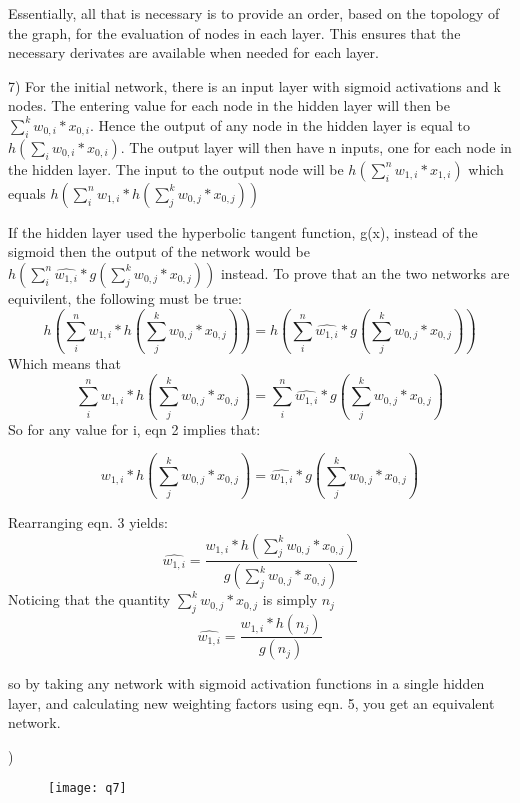 \documentclass[12pt]{article}
\begin{document}
Essentially, all that is necessary is to provide an order, based on the topology of the graph, for the evaluation of nodes in each layer. 
This ensures that the necessary derivates are available when needed for each layer. 

\pagebreak
\setcounter{equation}{0}
7) For the initial network, there is an input layer with sigmoid activations and k nodes. The entering value for each node in the 
hidden layer will then be $\sum_i^k w_{0,i}*x_{0,i}$. Hence the output of any node in the hidden layer is equal to 
$h(\sum_i w_{0,i}*x_{0,i})$. The output layer will then have n inputs, one for each node in the hidden layer. 
The input to the output node will be $h(\sum_i^n w_{1,i}*x_{1,i})$ which equals $h(\sum_i^n w_{1,i}*h(\sum_j^k w_{0,j}*x_{0,j}))$

If the hidden layer used the hyperbolic tangent function, g(x), instead of the sigmoid then the output of the network would be 
$h(\sum_i^n \hat{w_{1,i}}*g(\sum_j^k w_{0,j}*x_{0,j}))$ instead. To prove that an the two networks are equivilent, the following must be 
true: 
\begin{equation}
    h(\sum_i^n w_{1,i}*h(\sum_j^k w_{0,j}*x_{0,j})) = h(\sum_i^n \hat{w_{1,i}}*g(\sum_j^k w_{0,j}*x_{0,j}))
\end{equation}
Which means that 
\begin{equation}
    \sum_i^n w_{1,i}*h(\sum_j^k w_{0,j}*x_{0,j}) = \sum_i^n \hat{w_{1,i}}*g(\sum_j^k w_{0,j}*x_{0,j})
\end{equation}
So for any value for i, eqn 2 implies that: 

\begin{equation}
    w_{1,i}*h(\sum_j^k w_{0,j}*x_{0,j}) = \hat{w_{1,i}}*g(\sum_j^k w_{0,j}*x_{0,j})
\end{equation}

Rearranging eqn. 3 yields: 
\begin{equation}
     \hat{w_{1,i}} = \frac{w_{1,i}*h(\sum_j^k w_{0,j}*x_{0,j})}{g(\sum_j^k w_{0,j}*x_{0,j})}
\end{equation}
Noticing that the quantity $\sum_j^k w_{0,j}*x_{0,j}$ is simply $n_j$
\begin{equation}
     \hat{w_{1,i}} = \frac{w_{1,i}*h(n_j)}{g(n_j)}
\end{equation}

so by taking any network with sigmoid activation functions in a single hidden layer, and calculating new 
weighting factors using eqn. 5, you get an equivalent network. 

) 
    \begin{figure}[htb!]
        \texttt{[image: q7]}
    \end{figure}
    
\end{document}
